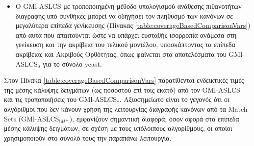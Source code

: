 \begin{itemize}
\item Ο GMl-ASLCS με τροποποιημένη μέθοδο υπολογισμού ανάθεσης πιθανοτήτων διαγραφής υπό συνθήκες μπορεί να οδηγήσει τον πληθυσμό των κανόνων σε μεγαλύτερα επίπεδα γενίκευσης (Πίνακας \ref{table:coverageBasedComparisonVars}) από αυτά που απαιτούνται ώστε να υπάρχει ευσταθής ισορροπία ανάμεσα στη γενίκευση και την ακρίβεια του τελικού μοντέλου, υποσκάπτοντας τα επίπεδα ακρίβειας και Ακριβούς Ορθότητας, όπως φαίνεται στα αποτελέσματα του GMl-ASLCS$_{d}$ για το σύνολο yeast.
\end{itemize}


Στον Πίνακα \ref{table:coverageBasedComparisonVars} παρατίθενται ενδεικτικές τιμές της μέσης κάλυψης δειγμάτων (ως ποσοστού επί τοις εκατό) από τον GMl-ASLCS και τις τροποποιήσεις του GMl-ASLCS$_{*}$. Αξιοσημείωτο είναι το γεγονός ότι οι αλγόριθμοι που δεν κάνουν χρήση της λειτουργίας διαγραφής κανόνων από τα Match Sets (GMl-ASLCS$_{!M*}$), εμφανίζουν σημαντική διαφορά, όσον αφορά στα επίπεδα μέσης κάλυψης δειγμάτων, σε σχέση με τους υπόλοιπους αλγορίθμους, οι οποίοι χρησιμοποιούν στο σύνολό τους την παραπάνω λειτουργία.

